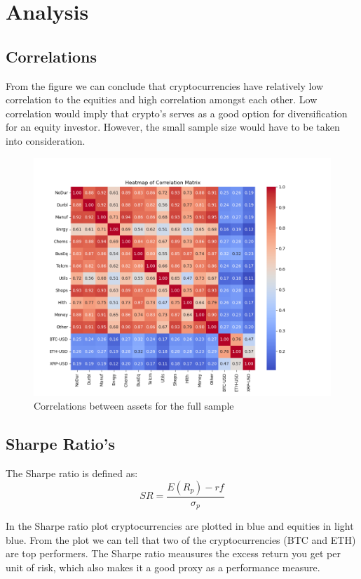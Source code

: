 \documentclass[12pt,a4paper]{article}
\begin{document}
\section{Analysis}\label{sec:analysis}
\subsection{Correlations}

From the figure we can conclude that cryptocurrencies have relatively low correlation to the equities and high correlation 
amongst each other. Low correlation would imply that crypto's serves as a good option for diversification for an equity 
investor. However, the small sample size would have to be taken into consideration. 
\begin{figure}[H]
    \centering
    \includegraphics[width=1\linewidth]{Figures/heatmap_correlation.png}
    \caption{Correlations between assets for the full sample}
    \label{fig:correlations}
\end{figure}

\subsection{Sharpe Ratio's}
The Sharpe ratio is defined as: 
$$SR = \frac{E(R_p)-rf}{\sigma_p}$$

\noindent In the Sharpe ratio plot cryptocurrencies are plotted in blue and equities in light blue. From the plot we can 
tell that two of the cryptocurrencies (BTC and ETH) are top performers. The Sharpe ratio meausures the excess return you 
get per unit of risk, which also makes it a good proxy as a performance measure. 
\end{document}
